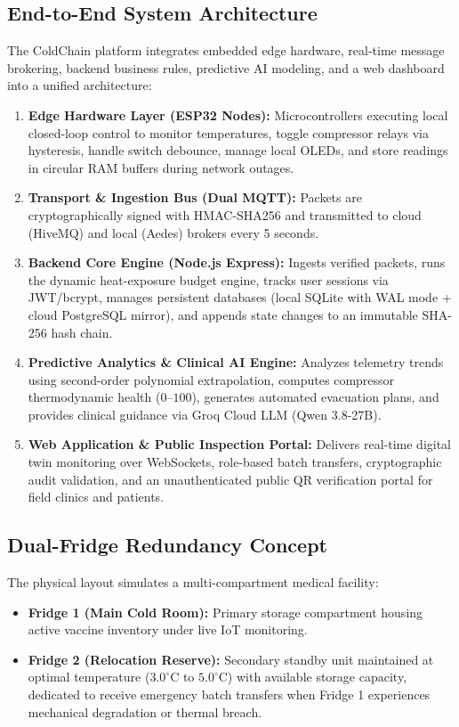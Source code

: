 \documentclass[11pt,a4paper]{article}
\begin{document}
\subsection{End-to-End System Architecture}
The ColdChain platform integrates embedded edge hardware, real-time message brokering, backend business rules, predictive AI modeling, and a web dashboard into a unified architecture:
\begin{enumerate}[label=\textbf{\arabic*.}]
    \item \textbf{Edge Hardware Layer (ESP32 Nodes):} Microcontrollers executing local closed-loop control to monitor temperatures, toggle compressor relays via hysteresis, handle switch debounce, manage local OLEDs, and store readings in circular RAM buffers during network outages.
    \item \textbf{Transport \& Ingestion Bus (Dual MQTT):} Packets are cryptographically signed with HMAC-SHA256 and transmitted to cloud (HiveMQ) and local (Aedes) brokers every 5 seconds.
    \item \textbf{Backend Core Engine (Node.js Express):} Ingests verified packets, runs the dynamic heat-exposure budget engine, tracks user sessions via JWT/bcrypt, manages persistent databases (local SQLite with WAL mode + cloud PostgreSQL mirror), and appends state changes to an immutable SHA-256 hash chain.
    \item \textbf{Predictive Analytics \& Clinical AI Engine:} Analyzes telemetry trends using second-order polynomial extrapolation, computes compressor thermodynamic health ($0$--$100$), generates automated evacuation plans, and provides clinical guidance via Groq Cloud LLM (Qwen 3.8-27B).
    \item \textbf{Web Application \& Public Inspection Portal:} Delivers real-time digital twin monitoring over WebSockets, role-based batch transfers, cryptographic audit validation, and an unauthenticated public QR verification portal for field clinics and patients.
\end{enumerate}

\subsection{Dual-Fridge Redundancy Concept}
The physical layout simulates a multi-compartment medical facility:
\begin{itemize}[leftmargin=2em]
    \item \textbf{Fridge 1 (Main Cold Room):} Primary storage compartment housing active vaccine inventory under live IoT monitoring.
    \item \textbf{Fridge 2 (Relocation Reserve):} Secondary standby unit maintained at optimal temperature ($3.0^\circ\text{C}$ to $5.0^\circ\text{C}$) with available storage capacity, dedicated to receive emergency batch transfers when Fridge 1 experiences mechanical degradation or thermal breach.
\end{itemize}
\end{document}
